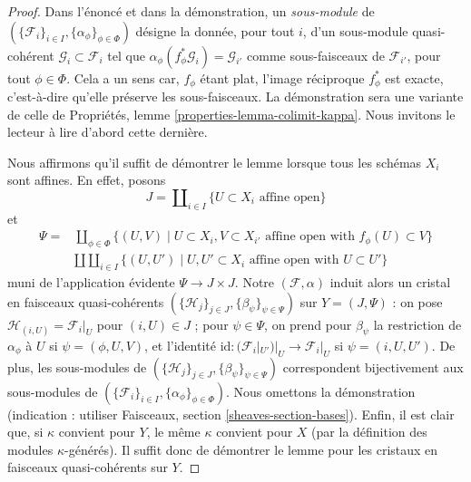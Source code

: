 \begin{proof}
Dans l'énoncé et dans la démonstration, un {\it sous-module} de $(\{\mathcal{F}_i\}_{i \in I}, \{\alpha_\phi\}_{\phi \in \Phi})$ désigne la donnée, pour tout $i$, d'un sous-module quasi-cohérent $\mathcal{G}_i \subset \mathcal{F}_i$ tel que $\alpha_\phi(f_\phi^*\mathcal{G}_i) = \mathcal{G}_{i'}$ comme sous-faisceaux de $\mathcal{F}_{i'}$, pour tout $\phi \in \Phi$. Cela a un sens car, $f_\phi$ étant plat, l'image réciproque $f^*_\phi$ est exacte, c'est-à-dire qu'elle préserve les sous-faisceaux. La démonstration sera une variante de celle de Propriétés, lemme \ref{properties-lemma-colimit-kappa}. Nous invitons le lecteur à lire d'abord cette dernière.

\medskip\noindent
Nous affirmons qu'il suffit de démontrer le lemme lorsque tous les schémas $X_i$ sont affines. En effet, posons
$$
J = \coprod\nolimits_{i \in I} \{U \subset X_i\text{ affine open}\}
$$
et
\begin{align*}
\Psi = & \coprod\nolimits_{\phi \in \Phi}
\{
(U, V) \mid
U \subset X_i, V \subset X_{i'}\text{ affine open with } f_\phi(U) \subset V
\} \\
&
\amalg \coprod\nolimits_{i \in I}
\{
(U, U') \mid
U, U' \subset X_i\text{ affine open with } U \subset U'
\}
\end{align*}
muni de l'application évidente $\Psi \to J \times J$. Notre $(\mathcal{F}, \alpha)$ induit alors un cristal en faisceaux quasi-cohérents $(\{\mathcal{H}_j\}_{j \in J}, \{\beta_\psi\}_{\psi \in \Psi})$ sur $Y = (J, \Psi)$ : on pose $\mathcal{H}_{(i, U)} = \mathcal{F}_i|_U$ pour $(i, U) \in J$ ; pour $\psi \in \Psi$, on prend pour $\beta_\psi$ la restriction de $\alpha_\phi$ à $U$ si $\psi = (\phi, U, V)$, et l'identité $\text{id} : (\mathcal{F}_i|_{U'})|_U \to \mathcal{F}_i|_U$ si $\psi = (i, U, U')$. De plus, les sous-modules de $(\{\mathcal{H}_j\}_{j \in J}, \{\beta_\psi\}_{\psi \in \Psi})$ correspondent bijectivement aux sous-modules de $(\{\mathcal{F}_i\}_{i \in I}, \{\alpha_\phi\}_{\phi \in \Phi})$. Nous omettons la démonstration (indication : utiliser Faisceaux, section \ref{sheaves-section-bases}). Enfin, il est clair que, si $\kappa$ convient pour $Y$, le même $\kappa$ convient pour $X$ (par la définition des modules $\kappa$-générés). Il suffit donc de démontrer le lemme pour les cristaux en faisceaux quasi-cohérents sur $Y$.


\end{proof}
